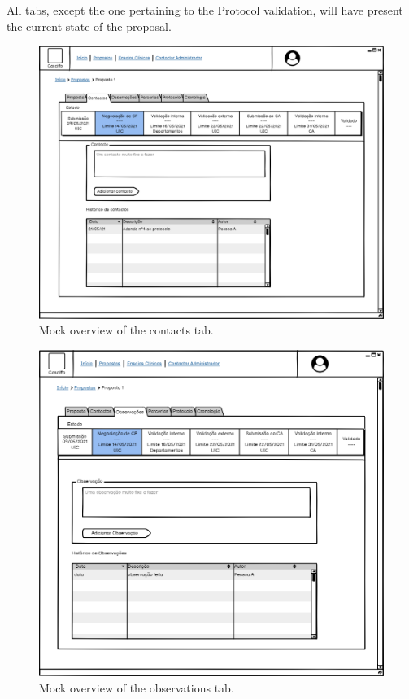 All tabs, except the one pertaining to the Protocol validation, will have present the current state of the proposal.

\begin{figure}[H]
    \centering
    \includegraphics[scale=0.35]{images/proposta-contactos.png}
    \caption{Mock overview of the contacts tab.}
    \label{fig:proposta-contactos}
\end{figure}

\begin{figure}[H]
    \centering
    \includegraphics[scale=0.35]{images/proposta-observações.png}
    \caption{Mock overview of the observations tab.}
    \label{fig:proposta-observações}
\end{figure}


